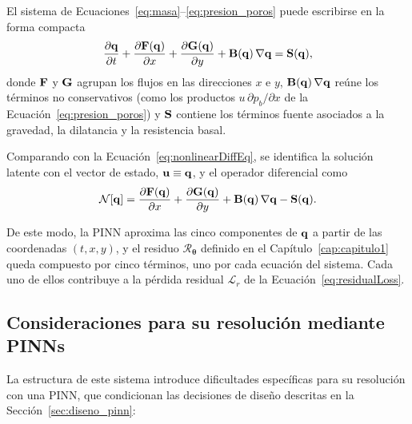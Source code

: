 El sistema de Ecuaciones~\eqref{eq:masa}--\eqref{eq:presion_poros} puede escribirse en la forma compacta
\begin{equation}
    \frac{\partial \mathbf{q}}{\partial t}
    + \frac{\partial \mathbf{F}(\mathbf{q})}{\partial x}
    + \frac{\partial \mathbf{G}(\mathbf{q})}{\partial y}
    + \mathbf{B}(\mathbf{q})\,\nabla\mathbf{q}
    = \mathbf{S}(\mathbf{q}),
    \label{eq:forma_compacta}
\end{equation}
donde $\mathbf{F}$ y $\mathbf{G}$ agrupan los flujos en las direcciones $x$ e $y$, $\mathbf{B}(\mathbf{q})\,\nabla\mathbf{q}$ reúne los términos no conservativos (como los productos $u\,\partial p_b/\partial x$ de la Ecuación~\eqref{eq:presion_poros}) y $\mathbf{S}$ contiene los términos fuente asociados a la gravedad, la dilatancia y la resistencia basal.

Comparando con la Ecuación~\eqref{eq:nonlinearDiffEq}, se identifica la solución latente con el vector de estado, $\mathbf{u} \equiv \mathbf{q}$, y el operador diferencial como
\begin{equation}
    \mathcal{N}[\mathbf{q}] = \frac{\partial \mathbf{F}(\mathbf{q})}{\partial x} + \frac{\partial \mathbf{G}(\mathbf{q})}{\partial y} + \mathbf{B}(\mathbf{q})\,\nabla\mathbf{q} - \mathbf{S}(\mathbf{q}).
    \label{eq:operador_lahar}
\end{equation}

De este modo, la PINN aproxima las cinco componentes de $\mathbf{q}$ a partir de las coordenadas $(t,x,y)$, y el residuo $\mathcal{R}_{\boldsymbol{\theta}}$ definido en el Capítulo~\ref{cap:capitulo1} queda compuesto por cinco términos, uno por cada ecuación del sistema. Cada uno de ellos contribuye a la pérdida residual $\mathcal{L}_r$ de la Ecuación~\eqref{eq:residualLoss}.

\subsection{Consideraciones para su resolución mediante PINNs}
\label{subsec:consideraciones_pinn}

La estructura de este sistema introduce dificultades específicas para su resolución con una PINN, que condicionan las decisiones de diseño descritas en la Sección~\ref{sec:diseno_pinn}:

